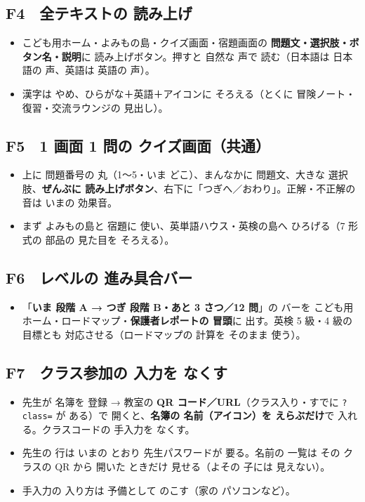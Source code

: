 \documentclass[a4paper,10pt]{article}
\begin{document}
\subsection{F4　全テキストの 読み上げ}
\begin{itemize}
\item こども用ホーム・よみもの島・クイズ画面・宿題画面の \textbf{問題文・選択肢・ボタン名・説明}に 読み上げボタン。押すと 自然な 声で 読む（日本語は 日本語の 声、英語は 英語の 声）。
\item 漢字は やめ、ひらがな＋英語＋アイコンに そろえる（とくに 冒険ノート・復習・交流ラウンジの 見出し）。
\end{itemize}

\subsection{F5　1 画面 1 問の クイズ画面（共通）}
\begin{itemize}
\item 上に 問題番号の 丸（1〜5・いま どこ）、まんなかに 問題文、大きな 選択肢、\textbf{ぜんぶに 読み上げボタン}、右下に「つぎへ／おわり」。正解・不正解の 音は いまの 効果音。
\item まず よみもの島と 宿題に 使い、英単語ハウス・英検の島へ ひろげる（7 形式の 部品の 見た目を そろえる）。
\end{itemize}

\subsection{F6　レベルの 進み具合バー}
\begin{itemize}
\item 「\textbf{いま 段階 A → つぎ 段階 B・あと 3 さつ／12 問}」の バーを こども用ホーム・ロードマップ・\textbf{保護者レポートの 冒頭}に 出す。英検 5 級・4 級の 目標とも 対応させる（ロードマップの 計算を そのまま 使う）。
\end{itemize}

\subsection{F7　クラス参加の 入力を なくす}
\begin{itemize}
\item 先生が 名簿を 登録 → 教室の \textbf{QR コード／URL}（クラス入り・すでに \texttt{?class=} が ある）で 開くと、\textbf{名簿の 名前（アイコン）を えらぶだけ}で 入れる。クラスコードの 手入力を なくす。
\item 先生の 行は いまの とおり 先生パスワードが 要る。名前の 一覧は その クラスの QR から 開いた ときだけ 見せる（よその 子には 見えない）。
\item 手入力の 入り方は 予備として のこす（家の パソコンなど）。
\end{itemize}
\end{document}
